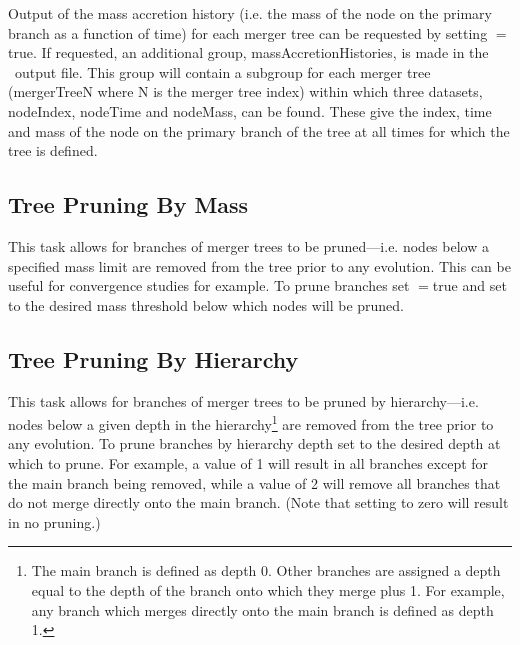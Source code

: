 Output of the mass accretion history (i.e. the mass of the \gls{node} on the primary branch as a function of time) for each merger tree can be requested by setting {\normalfont \ttfamily [massAccretionHistoryOutput]}$=${\normalfont \ttfamily true}. If requested, an additional group, {\normalfont \ttfamily massAccretionHistories}, is made in the \glc\ output file. This group will contain a subgroup for each merger tree ({\normalfont \ttfamily mergerTreeN} where {\normalfont \ttfamily N} is the merger tree index) within which three datasets, {\normalfont \ttfamily nodeIndex}, {\normalfont \ttfamily nodeTime} and {\normalfont \ttfamily nodeMass}, can be found. These give the index, time and mass of the \gls{node} on the primary branch of the tree at all times for which the tree is defined.

\subsection{Tree Pruning By Mass}

This task allows for branches of merger trees to be pruned---i.e. nodes below a specified mass limit are removed from the tree prior to any evolution. This can be useful for convergence studies for example. To prune branches set {\normalfont \ttfamily [mergerTreePruneBranches]}$=${\normalfont \ttfamily true} and set {\normalfont \ttfamily [mergerTreePruningMassThreshold]} to the desired mass threshold below which nodes will be pruned.

\subsection{Tree Pruning By Hierarchy}

This task allows for branches of merger trees to be pruned by hierarchy---i.e. nodes below a given depth in the hierarchy\footnote{The main branch is defined as depth 0. Other branches are assigned a depth equal to the depth of the branch onto which they merge plus 1. For example, any branch which merges directly onto the main branch is defined as depth 1.} are removed from the tree prior to any evolution.  To prune branches by hierarchy depth set {\normalfont \ttfamily [mergerTreePruneHierarchyAtDepth]} to the desired depth at which to prune. For example, a value of 1 will result in all branches except for the main branch being removed, while a value of 2 will remove all branches that do not merge directly onto the main branch. (Note that setting {\normalfont \ttfamily [mergerTreePruneHierarchyAtDepth]} to zero will result in no pruning.)

